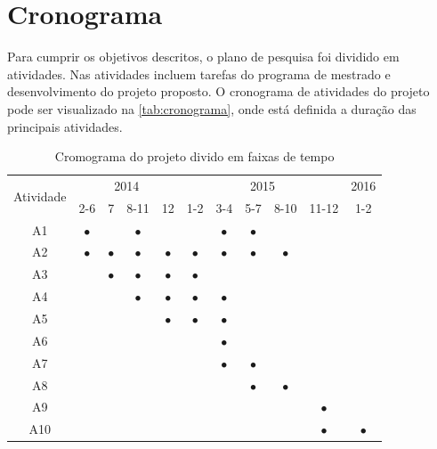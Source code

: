 \documentclass[mestrado, pre-defesa, english, brazil]{packages/icmc}
\begin{document}
\section{Cronograma}

Para cumprir os objetivos descritos, o plano de pesquisa foi dividido em atividades. Nas atividades incluem tarefas do programa de mestrado e desenvolvimento do projeto proposto. O cronograma de atividades do projeto pode ser visualizado na \autoref{tab:cronograma}, onde está definida a duração das principais atividades.

\begin{table}[!htbp]
    \centering
    \caption{Cromograma do projeto divido em faixas de tempo} \label{tab:cronograma}
    \begin{tabular}{c|c|c|c|c|c|c|c|c|c|c}
        \hline
        \multirow{2}{*}{Atividade} & \multicolumn{4}{c|}{2014} & \multicolumn{5}{c|}{2015}  & \multicolumn{1}{c}{2016} \\ \cline{2-11}
        & 2-6 & 7 & 8-11 & 12 & 1-2 & 3-4 & 5-7 & 8-10 & 11-12 & 1-2\\ \hline
        A1 & $\bullet$ & & $\bullet$ & & & $\bullet$ & $\bullet$ & & & \\ \hline
        A2 & $\bullet$ & $\bullet$ & $\bullet$ & $\bullet$ & $\bullet$ & $\bullet$ & $\bullet$ & $\bullet$ & & \\ \hline
        A3 & & $\bullet$ & $\bullet$ & $\bullet$ & $\bullet$ & & & & & \\ \hline
        A4 & & & $\bullet$ & $\bullet$ & $\bullet$ & $\bullet$ & & & & \\ \hline
        A5 & & & & $\bullet$ & $\bullet$ & $\bullet$ & & & & \\ \hline
        A6 & & & & & & $\bullet$ & & & & \\ \hline
        A7 & & & & & & $\bullet$ & $\bullet$ & & & \\ \hline 
        A8 & & & & & & & $\bullet$ & $\bullet$ & & \\ \hline
        A9 & & & & & & & & & $\bullet$ & \\ \hline
        A10 & & & & & & & & & $\bullet$ & $\bullet$ \\ \hline
    \end{tabular}
\end{table}%
\end{document}
